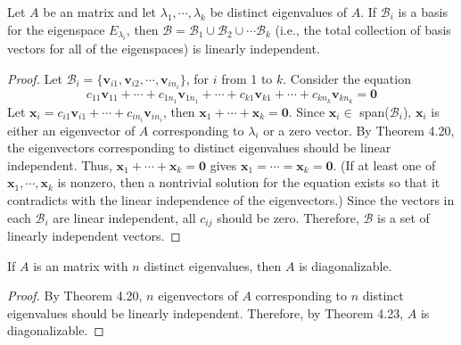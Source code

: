 \begin{theorem}
	Let $ A $ be an \nbyn matrix and let $\lambda_1, \cdots, \lambda_k$ be distinct eigenvalues of $ A $. If $ \mathcal{B}_i $ is a basis for the eigenspace $ E_{\lambda_i} $, then $ \mathcal{B}=\mathcal{B}_{1}\cup\mathcal{B}_{2}\cup\cdots\mathcal{B}_{k} $ (i.e., the total collection of basis vectors for all of the eigenspaces) is linearly independent.
\end{theorem}
\begin{proof}
	Let $\mathcal{B}_i = \{ \textbf{v}_{i1}, \textbf{v}_{i2}, \cdots, \textbf{v}_{in_i}\}$, for $i$ from 1 to $k$. Consider the equation \begin{equation*}
		c_{11}\textbf{v}_{11} + \cdots + c_{1n_1}\textbf{v}_{1n_1} + \cdots + c_{k1}\textbf{v}_{k1} + \cdots + c_{kn_k}\textbf{v}_{kn_k} = \textbf{0}
	\end{equation*}
	Let $\textbf{x}_i = c_{i1}\textbf{v}_{i1} + \cdots + c_{in_i} \textbf{v}_{in_i}$, then $\textbf{x}_1 + \cdots + \textbf{x}_k = \textbf{0}$. Since $\textbf{x}_i \in $ span($\mathcal{B}_i$), $\textbf{x}_i$ is either an eigenvector of $A$ corresponding to $\lambda_i$ or a zero vector. By Theorem 4.20, the eigenvectors corresponding to distinct eigenvalues should be linear independent. Thus, $\textbf{x}_1 + \cdots + \textbf{x}_k = \textbf{0}$ gives $\textbf{x}_1 = \cdots = \textbf{x}_k = \textbf{0}$. (If at least one of $\textbf{x}_1, \cdots, \textbf{x}_k$ is nonzero, then a nontrivial solution for the equation exists so that it contradicts with the linear independence of the eigenvectors.) Since the vectors in each $\mathcal{B}_i$ are linear independent, all $c_{ij}$ should be zero. Therefore, $\mathcal{B}$ is a set of linearly independent vectors.
\end{proof}

\begin{theorem}
	If $ A $ is an \nbyn matrix with $ n $ distinct eigenvalues, then $ A $ is diagonalizable.
\end{theorem}
\begin{proof}
	By Theorem 4.20, $n$ eigenvectors of $A$ corresponding to $n$ distinct eigenvalues should be linearly independent. Therefore, by Theorem 4.23, $A$ is diagonalizable.
\end{proof}

